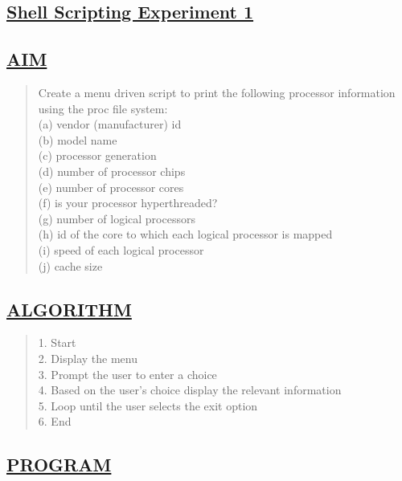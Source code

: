 \documentclass[a4paper, 12pt]{article}
\begin{document}
\newpage
\begin{center}
\section*{\LARGE \textbf{\underline{Shell Scripting Experiment 1}}} %
\end{center}

\subsection*{\underline{AIM}}
\begin{quote}
Create a menu driven script to print the following
processor information using the proc file system:\\
(a) vendor (manufacturer) id\\
(b) model name\\
(c) processor generation\\
(d) number of processor chips\\
(e) number of processor cores\\
(f) is your processor hyperthreaded?\\
(g) number of logical processors\\
(h) id of the core to which each logical processor is mapped\\
(i) speed of each logical processor\\
(j) cache size\\
\end{quote}

\subsection*{\underline{ALGORITHM}}
\begin{quote}
1. Start\\
2. Display the menu\\
3. Prompt the user to enter a choice\\
4. Based on the user's choice display the relevant information\\
5. Loop until the user selects the exit option\\
6. End
\end{quote}

\subsection*{\underline{PROGRAM}}
\begin{quote}
\inputminted[fontsize=\small,breaklines,breakanywhere]{sh}{shell1.sh}%
\end{quote}
\end{document}
